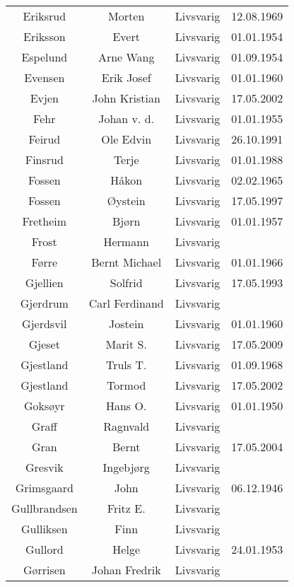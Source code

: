 \begin{tabular}{cccc}
        Eriksrud	&	Morten	&	Livsvarig 	&	12.08.1969	\\
        Eriksson	&	Evert	&	Livsvarig 	&	01.01.1954	\\
        Espelund	&	Arne Wang	&	Livsvarig 	&	01.09.1954	\\
        Evensen	&	Erik Josef	&	Livsvarig 	&	01.01.1960	\\
        Evjen 	&	John Kristian	&	Livsvarig	&	17.05.2002	\\
        Fehr	&	Johan v. d.	&	Livsvarig 	&	01.01.1955	\\
        Feirud	&	Ole Edvin	&	Livsvarig 	&	26.10.1991	\\
        Finsrud	&	Terje	&	Livsvarig 	&	01.01.1988	\\
        Fossen	&	Håkon	&	Livsvarig 	&	02.02.1965	\\
        Fossen 	&	Øystein	&	Livsvarig	&	17.05.1997	\\
        Fretheim	&	Bjørn	&	Livsvarig 	&	01.01.1957	\\
        Frost	&	Hermann	&	Livsvarig 	&		\\
        Førre	&	Bernt Michael	&	Livsvarig 	&	01.01.1966	\\
        Gjellien	&	Solfrid	&	Livsvarig 	&	17.05.1993	\\
        Gjerdrum	&	Carl Ferdinand	&	Livsvarig 	&		\\
        Gjerdsvil	&	Jostein	&	Livsvarig 	&	01.01.1960	\\
        Gjeset	&	Marit S.	&	Livsvarig	&	17.05.2009	\\
        Gjestland	&	Truls T. 	&	Livsvarig 	&	01.09.1968	\\
        Gjestland 	&	Tormod	&	Livsvarig	&	17.05.2002	\\
        Goksøyr	&	Hans O.	&	Livsvarig 	&	01.01.1950	\\
        Graff	&	Ragnvald	&	Livsvarig 	&		\\
        Gran 	&	Bernt	&	Livsvarig	&	17.05.2004	\\
        Gresvik	&	Ingebjørg	&	Livsvarig 	&		\\
        Grimsgaard	&	John	&	Livsvarig 	&	06.12.1946	\\
        Gullbrandsen	&	Fritz E. 	&	Livsvarig 	&		\\
        Gulliksen	&	Finn	&	Livsvarig 	&		\\
        Gullord	&	Helge	&	Livsvarig 	&	24.01.1953	\\
        Gørrisen	&	Johan Fredrik	&	Livsvarig 	&		\\

\end{tabular}
